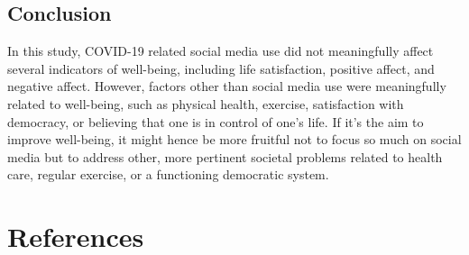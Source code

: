 \documentclass[
  english,
  man,mask,floatsintext]{apa6}
\begin{document}
\hypertarget{conclusion}{%
\subsection{Conclusion}\label{conclusion}}

In this study, COVID-19 related social media use did not meaningfully affect several indicators of well-being, including life satisfaction, positive affect, and negative affect.
However, factors other than social media use were meaningfully related to well-being, such as physical health, exercise, satisfaction with democracy, or believing that one is in control of one's life.
If it's the aim to improve well-being, it might hence be more fruitful not to focus so much on social media but to address other, more pertinent societal problems related to health care, regular exercise, or a functioning democratic system.

\newpage

\hypertarget{references}{%
\section{References}\label{references}}
\end{document}
